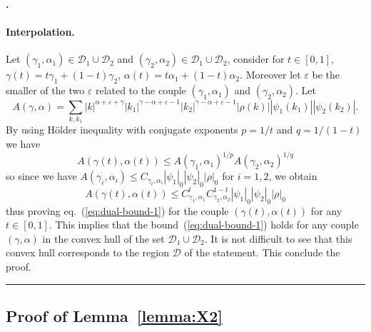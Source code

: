 \documentclass[a4paper,11pt,reqno]{article}
\newcommand{\eps}{\varepsilon}
\newcommand{\DD}{\mathcal{D}}
\newenvironment{proof}[1][Proof]{\textbf{#1.} }{\ \rule{0.5em}{0.5em}}
\begin{document}
\begin{proof}[]
\paragraph{Interpolation.}
Let $(\gamma_1,\alpha_1) \in \DD_1 \cup \DD_2$ and  $(\gamma_2,\alpha_2)
\in  \DD_1 \cup \DD_2$, consider for $t\in[0,1]$,  $\gamma(t)=t \gamma_1 +
(1-t) \gamma_2$,  $\alpha(t)=t \alpha_1 +
(1-t) \alpha_2$. Moreover let $\eps$ be the smaller of the two $\eps$ related to the couple $(\gamma_1,\alpha_1)$ and $(\gamma_2,\alpha_2)$.
Let
$$
A(\gamma,\alpha) = \sum_{k, k_1}  |k|^{\alpha+\eps+\gamma} |k_1|^{\gamma-\alpha+\eps-1} |k_2|^{\gamma-\alpha+\eps-1}
|\rho(k)| |\psi_1(k_1)| |\psi_2(k_2)|.
$$ 
By using H\"older inequality with conjugate exponents $p = 1/t$ and $q
= 1/(1-t)$ we have
$$
A(\gamma(t),\alpha(t)) \le A(\gamma_1,\alpha_1)^{1/p} A(\gamma_2,\alpha_2)^{1/q}
$$
so since we have
$
A(\gamma_i,\alpha_i) \le C_{\gamma_i,\alpha_i} |\psi_1|_0 |\psi_2|_0 |\rho|_0
$
for $i=1,2$, we obtain
$$
A(\gamma(t),\alpha(t)) \le C_{\gamma_1,\alpha_1}^{t}
C_{\gamma_2,\alpha_2}^{1-t} |\psi_1|_0 |\psi_2|_0 |\rho|_0
$$
thus proving eq.~(\ref{eq:dual-bound-1}) for the couple
$(\gamma(t),\alpha(t))$ for any $t\in [0,1]$. This implies that the
bound~(\ref{eq:dual-bound-1}) holds for any couple $(\gamma,\alpha)$
in the convex hull of the set $\DD_1 \cup \DD_2$. 
It is not difficult to see that this convex hull corresponds to the
region $\DD$ of the statement. This conclude the proof. 
\end{proof}



\subsection{Proof of Lemma~\ref{lemma:X2}}
\end{document}
